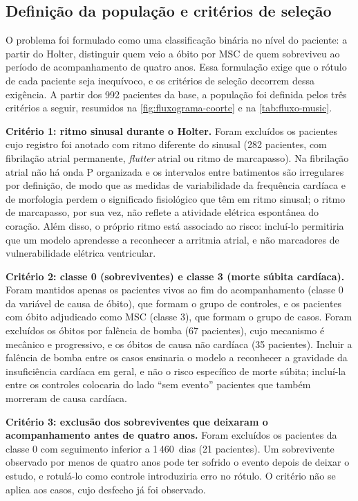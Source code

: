 \FloatBarrier

\subsection{Definição da população e critérios de seleção}
\label{subsec:met-criterios}

O problema foi formulado como uma classificação binária no nível do
paciente: a partir do Holter, distinguir quem veio a óbito por \gls{MSC} de
quem sobreviveu ao período de acompanhamento de quatro anos. Essa
formulação exige que o rótulo de cada paciente seja inequívoco, e os
critérios de seleção decorrem dessa exigência. A partir dos 992 pacientes da
base, a população foi definida pelos três critérios a seguir, resumidos na
\autoref{fig:fluxograma-coorte} e na \autoref{tab:fluxo-music}.

\textbf{Critério 1: ritmo sinusal durante o Holter.} Foram excluídos os
pacientes cujo registro foi anotado com ritmo diferente do sinusal (282
pacientes, com fibrilação atrial permanente, \textit{flutter} atrial ou
ritmo de marcapasso). Na fibrilação atrial não há onda P organizada e os
intervalos entre batimentos são irregulares por definição, de modo que as
medidas de variabilidade da frequência cardíaca e de morfologia perdem o
significado fisiológico que têm em ritmo sinusal; o ritmo de marcapasso,
por sua vez, não reflete a atividade elétrica espontânea do coração. Além
disso, o próprio ritmo está associado ao risco: incluí-lo permitiria que um
modelo aprendesse a reconhecer a arritmia atrial, e não marcadores de
vulnerabilidade elétrica ventricular.

\textbf{Critério 2: classe 0 (sobreviventes) e classe 3 (morte súbita
cardíaca).} Foram mantidos apenas os pacientes vivos ao fim do
acompanhamento (classe 0 da variável de causa de óbito), que formam o grupo
de controles, e os pacientes com óbito adjudicado como \gls{MSC} (classe 3),
que formam o grupo de casos. Foram excluídos os óbitos por falência de bomba
(67 pacientes), cujo mecanismo é mecânico e progressivo, e os óbitos de
causa não cardíaca (35 pacientes). Incluir a falência de bomba entre os
casos ensinaria o modelo a reconhecer a gravidade da insuficiência cardíaca
em geral, e não o risco específico de morte súbita; incluí-la entre os
controles colocaria do lado ``sem evento'' pacientes que também morreram de
causa cardíaca.

\textbf{Critério 3: exclusão dos sobreviventes que deixaram o acompanhamento
antes de quatro anos.} Foram excluídos os pacientes da classe 0 com
seguimento inferior a 1\,460~dias (21 pacientes). Um sobrevivente observado
por menos de quatro anos pode ter sofrido o evento depois de deixar o
estudo, e rotulá-lo como controle introduziria erro no rótulo. O critério
não se aplica aos casos, cujo desfecho já foi observado.

